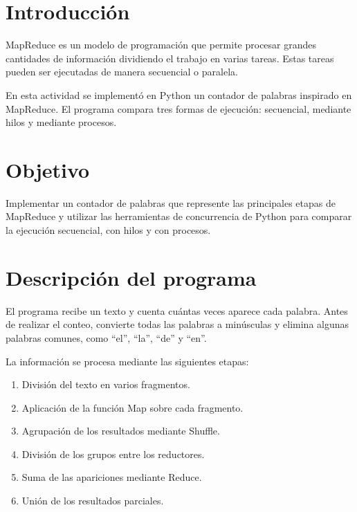 

\section{Introducción}

MapReduce es un modelo de programación que permite procesar grandes
cantidades de información dividiendo el trabajo en varias tareas. Estas
tareas pueden ser ejecutadas de manera secuencial o paralela.

En esta actividad se implementó en Python un contador de palabras inspirado
en MapReduce. El programa compara tres formas de ejecución: secuencial,
mediante hilos y mediante procesos.

\section{Objetivo}

Implementar un contador de palabras que represente las principales etapas
de MapReduce y utilizar las herramientas de concurrencia de Python para
comparar la ejecución secuencial, con hilos y con procesos.

\section{Descripción del programa}

El programa recibe un texto y cuenta cuántas veces aparece cada palabra.
Antes de realizar el conteo, convierte todas las palabras a minúsculas y
elimina algunas palabras comunes, como ``el'', ``la'', ``de'' y ``en''.

La información se procesa mediante las siguientes etapas:

\begin{enumerate}
    \item División del texto en varios fragmentos.
    \item Aplicación de la función Map sobre cada fragmento.
    \item Agrupación de los resultados mediante Shuffle.
    \item División de los grupos entre los reductores.
    \item Suma de las apariciones mediante Reduce.
    \item Unión de los resultados parciales.
\end{enumerate}

